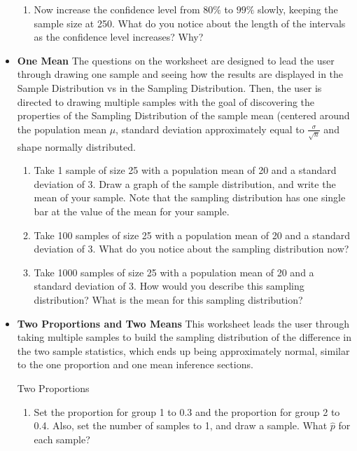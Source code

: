 \documentclass[11pt]{book}
\begin{document}
\begin{itemize}
\begin{enumerate}
\item Now increase the confidence level from $80\%$ to $99\%$ slowly, keeping the sample size at 250. What do you notice about the length of the intervals as the confidence level increases? Why?

\end{enumerate}

\item {\bf One Mean} The questions on the worksheet are designed to lead the user through drawing one sample and seeing how the results are displayed in the Sample Distribution vs in the Sampling Distribution. Then, the user is directed to drawing multiple samples with the goal of discovering the properties of the Sampling Distribution of the sample mean (centered around the population mean $\mu$, standard deviation approximately equal to $\frac{\sigma}{\sqrt{n}}$ and shape normally distributed.  

\begin{enumerate}
\item Take 1 sample of size 25 with a population mean of 20 and a standard deviation of 3. Draw a graph of the sample distribution, and write the mean of your sample. Note that the sampling distribution has one single bar at the value of the mean for your sample.

\item Take 100 samples of size 25 with a population mean of 20 and a standard deviation of 3.  What do you notice about the sampling distribution now?

\item Take 1000 samples of size 25 with a population mean of 20 and a standard deviation of 3.  How would you describe this sampling distribution? What is the mean for this sampling distribution?

\end{enumerate}

\item {\bf Two Proportions and Two Means} This worksheet leads the user through taking multiple samples to build the sampling distribution of the difference in the two sample statistics, which ends up being approximately normal, similar to the one proportion and one mean inference sections.

Two Proportions

\begin{enumerate}
\item Set the proportion for group 1 to 0.3 and the proportion for group 2 to 0.4. Also, set the number of samples to 1, and draw a sample. What $\hat{p}$ for each sample? 


\end{enumerate}
\end{itemize}
\end{document}
